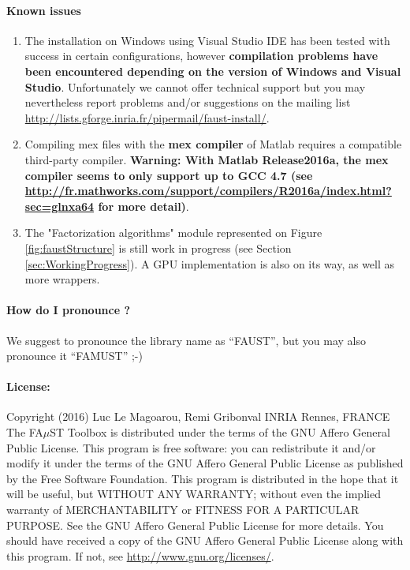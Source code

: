 \paragraph{Known issues}
\begin{enumerate}
\item The installation on Windows using Visual Studio IDE has been tested with success in certain configurations, however \textbf{compilation problems have been encountered depending on the version of Windows and Visual Studio}. Unfortunately we cannot offer technical support but you may nevertheless report problems and/or suggestions on the mailing list \url{http://lists.gforge.inria.fr/pipermail/faust-install/}. 
 
\item Compiling mex files with the \textbf{mex compiler} of Matlab requires a compatible third-party compiler. \textbf{Warning: With  Matlab Release2016a, the mex compiler seems to only support up to GCC 4.7 (see \url{http://fr.mathworks.com/support/compilers/R2016a/index.html?sec=glnxa64} for more detail)}.

\item The "Factorization algorithms" module represented on Figure \ref{fig:faustStructure} is still work in progress (see Section \ref{sec:WorkingProgress}). A GPU implementation is also on its way, as well as more wrappers.

\end{enumerate}

\paragraph{How do I pronounce \FAuST?} We suggest to pronounce the library name as ``FAUST'', but you may also pronounce it ``FAMUST'' ;-)


\paragraph{License:}Copyright (2016) Luc Le Magoarou, Remi Gribonval INRIA Rennes, FRANCE \\
The FA$\mu$ST Toolbox is distributed under the terms of the GNU Affero General Public License. This program is free software: you can redistribute it and/or modify it under the terms of the GNU Affero General Public License as published by the Free Software Foundation. This program is distributed in the hope that it will be useful, but WITHOUT ANY WARRANTY; without even the implied warranty of MERCHANTABILITY or FITNESS FOR A PARTICULAR PURPOSE.  See the GNU Affero General Public License for more details. You should have received a copy of the GNU Affero General Public License along with this program.  If not, see \url{http://www.gnu.org/licenses/}.
